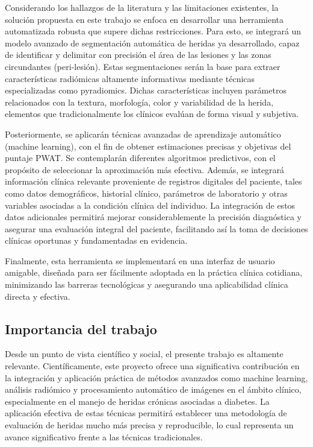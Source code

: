 Considerando los hallazgos de la literatura y las limitaciones existentes, la solución propuesta en este trabajo se enfoca en desarrollar una herramienta automatizada robusta que supere dichas restricciones. Para esto, se integrará un modelo avanzado de segmentación automática de heridas ya desarrollado, capaz de identificar y delimitar con precisión el área de las lesiones y las zonas circundantes (peri‑lesión). Estas segmentaciones serán la base para extraer características radiómicas altamente informativas mediante técnicas especializadas como pyradiomics. Dichas características incluyen parámetros relacionados con la textura, morfología, color y variabilidad de la herida, elementos que tradicionalmente los clínicos evalúan de forma visual y subjetiva.

Posteriormente, se aplicarán técnicas avanzadas de aprendizaje automático (machine learning), con el fin de obtener estimaciones precisas y objetivas del puntaje PWAT. Se contemplarán diferentes algoritmos predictivos, con el propósito de seleccionar la aproximación más efectiva. Además, se integrará información clínica relevante proveniente de registros digitales del paciente, tales como datos demográficos, historial clínico, parámetros de laboratorio y otras variables asociadas a la condición clínica del individuo. La integración de estos datos adicionales permitirá mejorar considerablemente la precisión diagnóstica y asegurar una evaluación integral del paciente, facilitando así la toma de decisiones clínicas oportunas y fundamentadas en evidencia.

Finalmente, esta herramienta se implementará en una interfaz de usuario amigable, diseñada para ser fácilmente adoptada en la práctica clínica cotidiana, minimizando las barreras tecnológicas y asegurando una aplicabilidad clínica directa y efectiva.

\subsection{Importancia del trabajo}
\label{ssec:IT}

Desde un punto de vista científico y social, el presente trabajo es altamente relevante. Científicamente, este proyecto ofrece una significativa contribución en la integración y aplicación práctica de métodos avanzados como machine learning, análisis radiómico y procesamiento automático de imágenes en el ámbito clínico, especialmente en el manejo de heridas crónicas asociadas a diabetes. La aplicación efectiva de estas técnicas permitirá establecer una metodología de evaluación de heridas mucho más precisa y reproducible, lo cual representa un avance significativo frente a las técnicas tradicionales.


